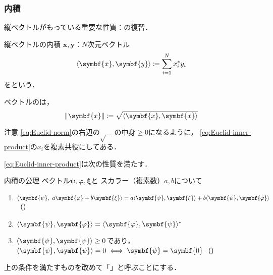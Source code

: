 \documentclass[
    10pt,
    ]{sotsu-beamer}
\begin{document}
\begin{frame}[allowframebreaks]
    \frametitle{内積}

    縦ベクトルがもっている重要な性質：の復習．

    \begin{block}{縦ベクトルの内積}
        $\symbf{x}, \symbf{y}$：$N$次元ベクトル
        \begin{equation}
            \label{eq:Euclid-inner-product}
            \iparen{\symbf{x}, \symbf{y}}
                \coloneq \sum_{i=1}^{N} x_i^* y_i
        \end{equation}
        をという．
    \end{block}

    ベクトルのは，
    \begin{equation}
        \label{eq:Euclid-norm}
        \norm{\symbf{x}} \coloneq \sqrt{\iparen{\symbf{x}, \symbf{x}}}
    \end{equation}

    \begin{alertblock}{注意}
        \eqref{eq:Euclid-norm}の右辺の$\sqrt{\quad}$の中身$\geq 0$になるように，
        \eqref{eq:Euclid-inner-product}の$x_i$を複素共役にしてある．
    \end{alertblock}

    \framebreak

    \eqref{eq:Euclid-inner-product}は次の性質を満たす．

    \begin{block}{内積の公理}
        ベクトル$\symbf{\psi}, \symbf{\varphi}, \symbf{\xi}$と
        スカラー（複素数）$a, b$について
        \begin{enumerate}
            \item $\iparen{\symbf{\psi}, \  a\symbf{\varphi} + b\symbf{\xi}} = a\iparen{\symbf{\psi}, \symbf{\xi}} + b\iparen{\symbf{\psi}, \symbf{\varphi}}$（）
            \item $\iparen{\symbf{\psi}, \symbf{\varphi}} = \conj{\iparen{\symbf{\varphi}, \symbf{\psi}}}$
            \item $\iparen{\symbf{\psi}, \symbf{\psi}} \geq 0$であり，
                $\iparen{\symbf{\psi}, \symbf{\psi}} = 0 \iff \symbf{\psi} = \symbf{0}$（）
        \end{enumerate}
    \end{block}

    上の条件を満たすものを改めて「」と呼ぶことにする．


\end{frame}
\end{document}
